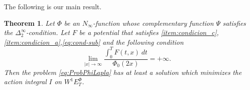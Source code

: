 \documentclass[twoside]{article}
\newtheorem{thm}{Theorem}[section]
\theoremstyle{remark}
\newcommand{\ephi}{E^{\Phi}}
\newcommand{\wphie}{W^{1}\ephi}
\begin{document}
The following is our main result. 




\begin{thm}\label{coercitividad-r}
  Let $\Phi$ be an $N_{\infty}$-function whose complementary function $\Psi$ satisfies the $\Delta_2^{\infty}$-condition. Let $F$ be a potential that satisfies \ref{item:condicion_c}, \ref{item:condicion_a},\eqref{eq:cond-sub} and the following condition
\begin{equation}\label{eq:propiedad-coercividad-phi0}
\lim_{|x|\to\infty}\frac{\int_{0}^{T}F(t,x)\ dt}{\Phi_0(2x)}=+\infty.
\end{equation}
Then the problem \eqref{eq:ProbPhiLapla} has at least a solution which minimizes the action integral $I$ on $\wphie_T$.
\end{thm}
\end{document}
